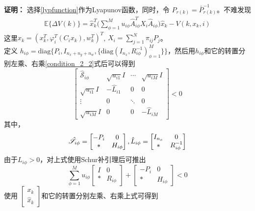 	{\bf 证明：} 选择\eqref{lypfunction}作为Lyapunov函数，同时，令 $P_{r(k)}=\bar{P}^{-1}_{r(k)}$。不难发现
	\begin{equation}
	\begin{split}
	\mathbb{E}\{\varDelta V(k)\}=\hat{x}^{T}_{k} \Big( \sum_{\phi=1}^{M}u_{i\phi}\hat{A}^{T}_{i\phi}X_{i}\hat{A}_{i\phi}\Big) \hat{x}_{k} -V(k,x_k,i)
	\end{split}
	\end{equation}
	这里$\hat{x}_{k}=(x^{T}_{k},\varphi^{T}_{i}(C_{i}x_{k}),w^{T}_{k})^{T}$, $ X_{i}=\sum_{j=1}^{N}\pi_{ij}P_{j}$。 \\
	定义 $h_{i\phi} = \mathrm{diag}\Big\{P_{i}, I_{n_x+n_y+n_w},\{\mathrm{diag}(I_{n_x},R^{-1}_{i\phi})^{M}_{\phi=1} \} \Big\}$，然后用$h_{i\phi}$和它的转置分别左乘、右乘\eqref{condition_2_2}式后可以得到
	\begin{equation}\nonumber
	\begin{bmatrix} 
	\hat{\mathscr{S}}_{i\phi}&
	\sqrt{u_{i1}}I&
	\cdots&
	\sqrt{u_{iM}}I\\
	\sqrt{u_{i1}}I&-\hat{L}_{i1}&0&0\\ 
	\vdots&0&\ddots&0\\
	\sqrt{u_{iM}}I&0&0&
	-\hat{L}_{iM}
	\end{bmatrix} <0
	\end{equation}
	其中，
	\begin{equation} \notag
	\begin{aligned}
	\hat{\mathscr{S}}_{i\phi}=\begin{bmatrix}
	-P_{i }&0\\
	*&H_{i\phi}
	\end{bmatrix},
	\hat{L}_{i\phi} = \begin{bmatrix}
	I_{n_x}&0\\
	*&R^{-1}_{i\phi}
	\end{bmatrix}
	\end{aligned}
	\end{equation}
	由于$L_{i\phi}>0$，对上式使用Schur补引理后可推出
	\begin{equation} \label{cons2}
	\sum_{\phi=1}^{M}u_{i\phi} \begin{bmatrix}
	I&0\\
	*&R_{i\phi}
	\end{bmatrix} + \begin{bmatrix}
	-P_{i }&0\\
	*&H_{i\phi}
	\end{bmatrix} <0
	\end{equation}
	使用 $\begin{bmatrix}
	x_{k}\\
	\hat{x}_{k}
	\end{bmatrix}$和它的转置分别左乘、右乘上式可得到
